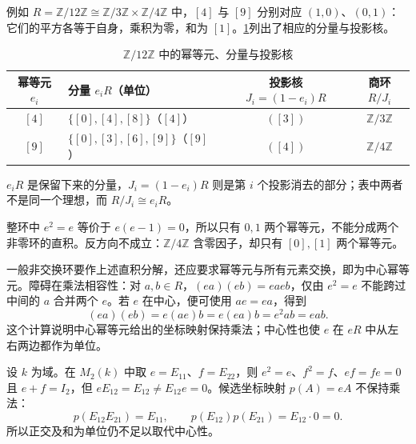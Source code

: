 \ProseParagraphBreak
例如 \(R=\mathbb Z/12\mathbb Z\cong\mathbb Z/3\mathbb Z\times\mathbb Z/4\mathbb Z\) 中，\([4]\) 与 \([9]\) 分别对应 \((1,0)\)、\((0,1)\)：它们的平方各等于自身，乘积为零，和为 \([1]\)。\cref{b1:tab:crt-idempotent-components}列出了相应的分量与投影核。

\begin{table}[htbp]
	\centering
	\caption{\(\mathbb Z/12\mathbb Z\) 中的幂等元、分量与投影核}
	\label{b1:tab:crt-idempotent-components}
	\begin{tabularx}{\linewidth}{@{}c>{\centering\arraybackslash}Xcc@{}}
		\toprule
		幂等元 \(e_i\) & 分量 \(e_iR\)（单位） & 投影核 \(J_i=(1-e_i)R\) & 商环 \(R/J_i\) \\
		\midrule
		\([4]\) & \(\{[0],[4],[8]\}\)（\([4]\)） & \(([3])\) & \(\mathbb Z/3\mathbb Z\) \\
		\([9]\) & \(\{[0],[3],[6],[9]\}\)（\([9]\)） & \(([4])\) & \(\mathbb Z/4\mathbb Z\) \\
		\bottomrule
	\end{tabularx}
\end{table}

\(e_iR\) 是保留下来的分量，\(J_i=(1-e_i)R\) 则是第 \(i\) 个投影消去的部分；表中两者不是同一个理想，而 \(R/J_i\cong e_iR\)。

\ProseParagraphBreak
整环中 \(e^2=e\) 等价于 \(e(e-1)=0\)，所以只有 \(0,1\) 两个幂等元，不能分成两个非零环的直积。反方向不成立：\(\mathbb Z/4\mathbb Z\) 含零因子，却只有 \([0],[1]\) 两个幂等元。

\ProseParagraphBreak
一般非交换环要作上述直积分解，还应要求幂等元与所有元素交换，即为中心幂等元。障碍在乘法相容性：对 \(a,b\in R\)，\((ea)(eb)=eaeb\)，仅由 \(e^2=e\) 不能跨过中间的 \(a\) 合并两个 \(e\)。若 \(e\) 在中心，便可使用 \(ae=ea\)，得到
\[
	(ea)(eb)=e(ae)b=e(ea)b=e^2ab=eab.
\]
这个计算说明中心幂等元给出的坐标映射保持乘法；中心性也使 \(e\) 在 \(eR\) 中从左右两边都作为单位。

\ProseParagraphBreak
设 \(k\) 为域。在 \(M_2(k)\) 中取 \(e=E_{11}\)、\(f=E_{22}\)，则 \(e^2=e\)、\(f^2=f\)、\(ef=fe=0\) 且 \(e+f=I_2\)，但 \(eE_{12}=E_{12}\ne E_{12}e=0\)。候选坐标映射 \(p(A)=eA\) 不保持乘法：
\[
	p(E_{12}E_{21})=E_{11},\qquad p(E_{12})p(E_{21})=E_{12}\cdot0=0.
\]
所以正交及和为单位仍不足以取代中心性。
